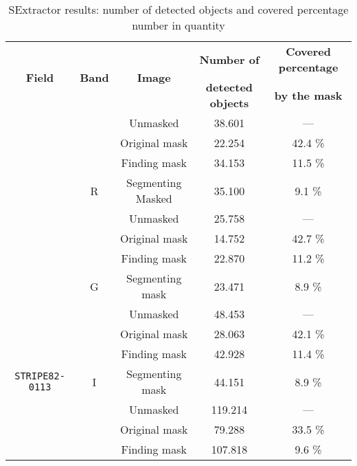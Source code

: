 \documentclass{article}
\begin{document}
\begin{table}[h!]
  \centering
  \caption{SExtractor results: number of detected objects and covered percentage number in quantity}
  \begin{tabular}{c|c|c|c|c}
    \cline{1-5}
    \multirow{2}{*}{\bf Field} & \multirow{2}{*}{\bf Band} & \multirow{2}{*}{\bf Image} &{\bf Number of} & {\bf Covered percentage} \\
    & & & {\bf detected objects} & {\bf by the mask} \\
    \hline
    \cellcolor{gray!20} & \cellcolor{red!20} & Unmasked & 38.601 & --- \\
    \cline{3-5}
    \cellcolor{gray!20} & \cellcolor{red!20} & Original mask & 22.254 & 42.4 \%\\
    \cline{3-5}
    \cellcolor{gray!20} & \cellcolor{red!20} & Finding mask & 34.153 & 11.5 \%\\
    \cline{3-5}
    \cellcolor{gray!20} & \multirow{-4}{*}{\cellcolor{red!20}R} & Segmenting Masked & 35.100 & 9.1 \%\\
    \cline{2-5}
    \cellcolor{gray!20} & \cellcolor{green!20} & Unmasked & 25.758 & --- \\
    \cline{3-5}
    \cellcolor{gray!20} & \cellcolor{green!20} & Original mask & 14.752 & 42.7 \%\\
    \cline{3-5}
    \cellcolor{gray!20} & \cellcolor{green!20} & Finding mask & 22.870 & 11.2 \%\\
    \cline{3-5}
    \cellcolor{gray!20} & \multirow{-4}{*}{\cellcolor{green!20}G} & Segmenting mask & 23.471 & 8.9 \%\\
    \cline{2-5}
    \cellcolor{gray!20} & \cellcolor{blue!20} & Unmasked & 48.453 & --- \\
    \cline{3-5}
    \cellcolor{gray!20} & \cellcolor{blue!20} & Original mask & 28.063 & 42.1 \%\\
    \cline{3-5}
    \cellcolor{gray!20} & \cellcolor{blue!20} & Finding mask & 42.928 & 11.4 \%\\
    \cline{3-5}
    \multirow{-9}{*}{\cellcolor{gray!20} \texttt{STRIPE82-0113}} & \multirow{-4}{*}{\cellcolor{blue!20}I} & Segmenting mask & 44.151 & 8.9 \%\\
    \hline
    \cellcolor{gray!20} & \cellcolor{red!20} & Unmasked & 119.214 & --- \\
    \cline{3-5}
    \cellcolor{gray!20} & \cellcolor{red!20} & Original mask & 79.288 & 33.5 \%\\
    \cline{3-5}
    \cellcolor{gray!20} & \cellcolor{red!20} & Finding mask & 107.818 & 9.6 \%\\

\end{tabular}
\end{table}
\end{document}
